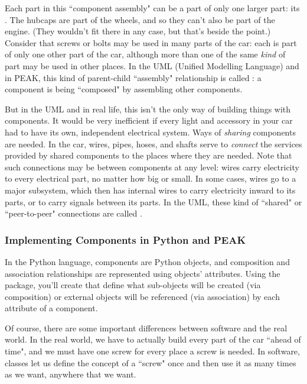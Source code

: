 Each part in this ``component assembly" can be a part of only one larger part:
its .  The hubcaps are part of the wheels,
and so they can't also be part of the engine.  (They wouldn't fit there in 
any case, but that's beside the point.)  Consider that screws or bolts may
be used in many parts of the car: each is part of only one other part of
the car, although more than one of the same \emph{kind} of part may be used
in other places.  In the UML (Unified Modelling Language) and in PEAK, this
kind of parent-child ``assembly" relationship  is called :
a component is being ``composed" by assembling other components.

But in the UML and in real life, this isn't the only way of building things
with components.  It would be very inefficient if every light and accessory
in your car had to have its own, independent electrical system.  Ways of
\emph{sharing} components are needed.  In the car, wires, pipes, hoses, and
shafts serve to \emph{connect} the services provided by shared components to
the places where they are needed.  Note that such connections may be between
components at any level: wires carry electricity to every electrical part, no
matter how big or small.  In some cases, wires go to a major subsystem, which
then has internal wires to carry electricity inward to its parts, or to carry
signals between its parts.  In  the UML, these kind of ``shared" or
``peer-to-peer" connections are called .














\subsubsection{Implementing Components in Python and PEAK}

In the Python language, components are Python objects, and composition and
association relationships are represented using objects' attributes.  Using
the  package, you'll create 
that  define what sub-objects will be created (via composition) or external
objects  will be referenced (via association) by each attribute of a component.

Of course, there are some important differences between software and the real
world.  In the real world, we have to actually build every part of the car
``ahead of time", and we must have one screw for every place a screw is needed.
In software, classes let us define the concept of a ``screw" once and then use
it as many times as we want, anywhere that we want.

